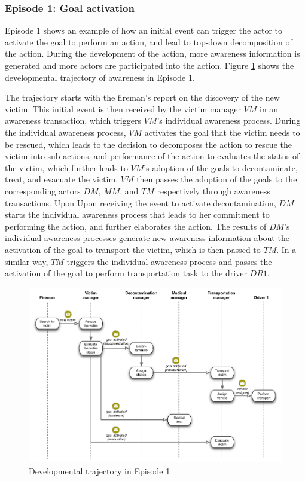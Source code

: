 \subsubsection{Episode 1: Goal activation} %
\label{ssub:episode_1_goal_activation}
 Episode 1 shows an example of how an initial event can trigger the actor to activate the goal to perform an action, and lead to top-down decomposition of the action. During the development of the action, more awareness information is generated and more actors are participated into the action. Figure \ref{fig:episode_1_interaction} shows the developmental trajectory of awareness in Episode 1.

The trajectory starts with the fireman's report on the discovery of the new victim. This initial event is then received by the victim manager $VM$ in an awareness transaction, which triggers $VM$'s individual awareness process. During the individual awareness process, $VM$ activates the goal that the victim needs to be rescued, which leads to the decision to decomposes the action to rescue the victim into sub-actions, and performance of the action to evaluates the status of the victim, which further leads to $VM$'s adoption of the goals to decontaminate, treat, and evacuate the victim. $VM$ then passes the adoption of the goals to the corresponding actors $DM$, $MM$, and $TM$ respectively through awareness transactions. Upon Upon receiving the event to activate decontamination, $DM$ starts the individual awareness process that leads to her commitment to performing the action, and further elaborates the action. The results of $DM$'s individual awareness processes generate new awareness information about the activation of the goal to transport the victim, which is then passed to $TM$. In a similar way, $TM$ triggers the individual awareness process and passes the activation of the goal to perform transportation task to the driver $DR1$.

\begin{figure}[htbp] %
   \centering
   \includegraphics[width=5.8in]{episode_1_interaction.pdf} 
   \caption{Developmental trajectory in Episode 1}
   \label{fig:episode_1_interaction}
\end{figure}

